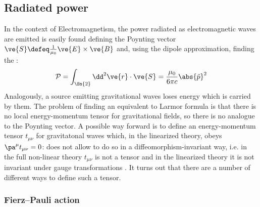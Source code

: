 \subsection{Radiated power}

In the context of Electromagnetism, the power radiated as electromagnetic waves are emitted is easily found defining the Poynting vector $ \ve{S} \defeq \frac{1}{\mu_0} \ve{E} \times \ve{B} $ and, using the dipole approximation, finding the :
\begin{equation*}
  \mathcal{P} = \int_{\Sn{2}} \dd^2\ve{r} \cdot \ve{S} = \frac{\mu_0}{6\pi c} \abs{\ddot{p}}^2
\end{equation*}
Analogously, a source emitting gravitational waves loses energy which is carried by them. The problem of finding an equivalent to Larmor formula is that there is no local energy-momentum tensor for gravitational fields, so there is no analogue to the Poynting vector. A possible way forward is to define an energy-momentum tensor $ t_{\mu \nu} $ for gravitatonal waves which, in the linearized theory, obeys $ \pa^\mu t_{\mu \nu} = 0 $:  does not allow to do so in a diffeomorphism-invariant way, i.e. in the full non-linear theory $ t_{\mu \nu} $ is not a tensor and in the linearized theory it is not invariant under gauge transformations . It turns out that there are a number of different ways to define such a tensor.

\subsubsection{Fierz--Pauli action}

